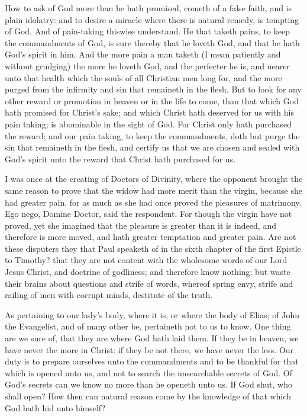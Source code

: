 How to ask of God more than he hath promised, 
cometh of a false faith, and is plain idolatry: and to 
desire a miracle where there is natural remedy, is tempting 
of God. And of pain-taking thiswise understand. He 
that taketh pains, to keep the commandments of God, is 
sure thereby that he loveth God, and that he hath God's 
spirit in him. And the more pain a man taketh (I mean
patiently and without grudging) the more he loveth God,
and the perfecter he is, and nearer unto that health which 
the souls of all Christian men long for, and the more purged 
from the infirmity and sin that remaineth in the flesh. But 
to look for any other reward or promotion in heaven or in 
the life to come, than that which God hath promised for 
Christ's sake; and which Christ hath deserved for us with 
his pain taking; is abominable in the sight of God. For 
Christ only hath purchased the reward; and our pain taking, 
to keep the commandments, doth but purge the sin that 
remaineth in the flesh, and certify us that we are chosen 
and sealed with God's spirit unto the reward that Christ 
hath purchased for us. 

I was once at the creating of Doctors of Divinity, where 
the opponent brought the same reason to prove that the 
widow had more merit than the virgin, because she had 
greater pain, for as much as she had once proved the pleasures
of matrimony. Ego nego, Domine Doctor, said the 
respondent. For though the virgin have not proved, yet 
she imagined that the pleasure is greater than it is indeed, 
and therefore is more moved, and hath greater temptation 
and greater pain. Are not these disputers they that Paul 
speaketh of in the sixth chapter of the first Epistle to 
Timothy? that they are not content with the wholesome 
words of our Lord Jesus Christ, and doctrine of godliness; 
and therefore know nothing: but waste their brains 
about questions and strife of words, whereof spring envy, 
strife and railing of men with corrupt minds, destitute of 
the truth. 

As pertaining to our lady's body, where it is, or where 
the body of Elias; of John the Evangelist, and of many 
other be, pertaineth not to us to know. One thing are 
we sure of, that they are where God hath laid them. If 
they be in heaven, we have never the more in Christ: if 
they be not there, we have never the less. Our duty is to 
prepare ourselves unto the commandments and to be 
thankful for that which is opened unto us, and not to search 
the unsearchable secrets of God. Of God's secrets can 
we know no more than he openeth unto us. If God shut, 
who shall open? How then can natural reason come by 
the knowledge of that which God hath hid unto himself? 

